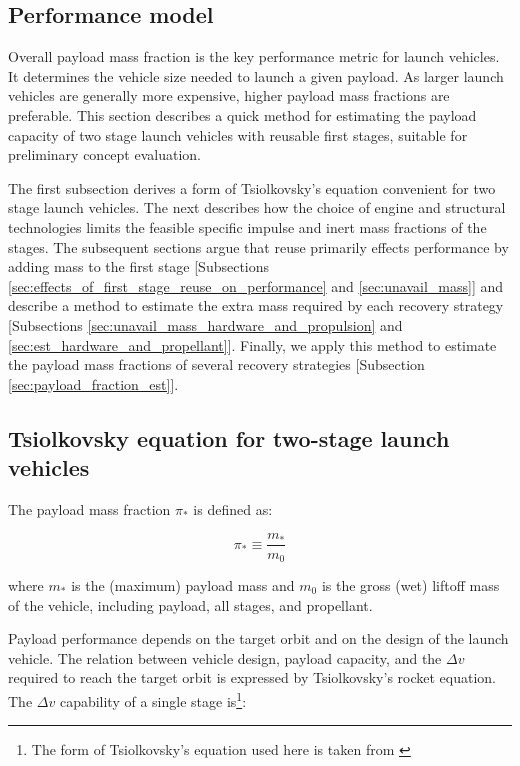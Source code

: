 \documentclass{iaf-iac}
\begin{document}
\begin{multicols}{2}
\section{Performance model}

Overall payload mass fraction is the key performance metric for launch vehicles. It determines the vehicle size needed to launch a given payload. As larger launch vehicles are generally more expensive, higher payload mass fractions are preferable. This section describes a quick method for estimating the payload capacity of two stage launch vehicles with reusable first stages, suitable for preliminary concept evaluation.

The first subsection derives a form of Tsiolkovsky's equation convenient for two stage launch vehicles. The next describes how the choice of engine and structural technologies limits the feasible specific impulse and inert mass fractions of the stages. The subsequent sections argue that reuse primarily effects performance by adding mass to the first stage [Subsections \ref{sec:effects_of_first_stage_reuse_on_performance} and \ref{sec:unavail_mass}] and describe a method to estimate the extra mass required by each recovery strategy [Subsections \ref{sec:unavail_mass_hardware_and_propulsion} and \ref{sec:est_hardware_and_propellant}]. Finally, we apply this method to estimate the payload mass fractions of several recovery strategies [Subsection \ref{sec:payload_fraction_est}].

\subsection{Tsiolkovsky equation for two-stage launch vehicles}
The payload mass fraction $\pi_*$ is defined as:

\begin{equation}
\pi_* \equiv \frac{m_*}{m_0}
\end{equation}

where $m_*$ is the (maximum) payload mass and $m_0$ is the gross (wet) liftoff mass of the vehicle, including payload, all stages, and propellant.

Payload performance depends on the target orbit and on the design of the launch vehicle. The relation between vehicle design, payload capacity, and the $\Delta v$ required to reach the target orbit is expressed by Tsiolkovsky’s rocket equation. The $\Delta v$ capability of a single stage is\footnote{The form of Tsiolkovsky's equation used here is taken from \cite{Wiesel2010}}:


\end{multicols}
\end{document}
